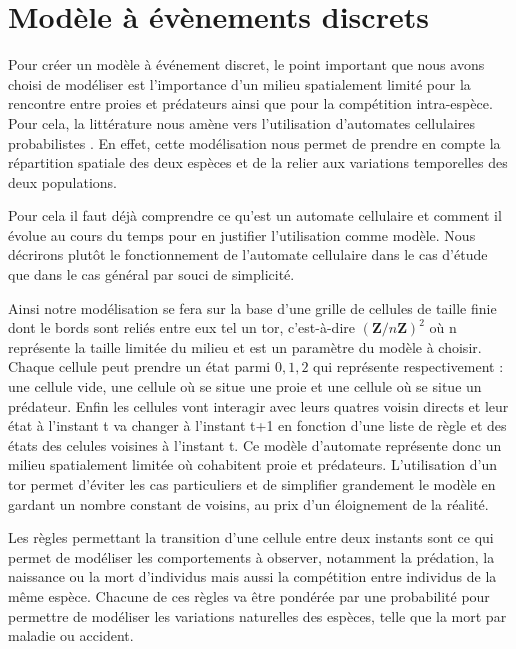 \chapter{Modèle à évènements discrets}
\label{chapitre:etat_discret}

Pour créer un modèle à événement discret, le point important que nous avons choisi de modéliser est l'importance d'un milieu spatialement limité pour la rencontre entre proies et prédateurs ainsi que pour la compétition intra-espèce. Pour cela, la littérature nous amène vers l'utilisation d'automates cellulaires probabilistes \cite{Karvhallo} . En effet, cette modélisation nous permet de prendre en compte la répartition spatiale des deux espèces et de la relier aux variations temporelles des deux populations. 


Pour cela il faut déjà comprendre ce qu'est un automate cellulaire et comment il évolue au cours du temps pour en justifier l'utilisation comme modèle. Nous décrirons plutôt le fonctionnement de l'automate cellulaire dans le cas d'étude que dans le cas général par souci de simplicité.

\vspace{0.3cm}
Ainsi notre modélisation se fera sur la base d'une grille de cellules de taille finie dont le bords sont reliés entre eux tel un tor, c'est-à-dire ${(\mathbf{Z}/n\mathbf{Z})^2}$ où n représente la taille limitée du milieu et est un paramètre du modèle à choisir. Chaque cellule peut prendre un état parmi ${0,1,2}$ qui représente respectivement : une cellule vide, une cellule où se situe une proie et une cellule où se situe un prédateur. Enfin les cellules vont interagir avec leurs quatres voisin directs et leur état à l'instant t va changer à l'instant t+1 en fonction d'une liste de règle et des états des celules voisines à l'instant t. Ce modèle d'automate représente donc un milieu spatialement limitée où cohabitent proie et prédateurs. L'utilisation d'un tor permet d'éviter les cas particuliers et de simplifier grandement le modèle en gardant un nombre constant de voisins, au prix d'un éloignement de la réalité.

\vspace{0.3cm}
Les règles permettant la transition d'une cellule entre deux instants sont ce qui permet de modéliser les comportements à observer, notamment la prédation, la naissance ou la mort d'individus mais aussi la compétition entre individus de la même espèce. Chacune de ces règles va être pondérée par une probabilité pour permettre de modéliser les variations naturelles des espèces, telle que la mort par maladie ou accident.


